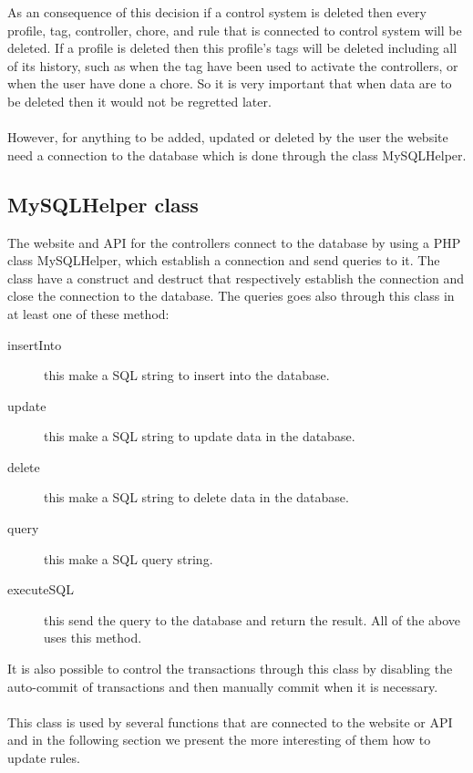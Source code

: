 As an consequence of this decision if a control system is deleted then every profile, tag, controller, chore, and rule that is connected to control system will be deleted. If a profile is deleted then this profile's tags will be deleted including all of its history, such as when the tag have been used to activate the controllers, or when the user have done a chore.
 So it is very important that when data are to be deleted then it would not be regretted later.  \\\\

However, for anything to be added, updated or deleted by the user the website need a connection to the database which is done through the class MySQLHelper. 

\subsection{MySQLHelper class}
The website and API for the controllers connect to the database by using a PHP class MySQLHelper, which establish a connection and send queries to it. The class have a construct and destruct that respectively establish the connection and close the connection to the database. The queries goes also through this class in at least one of these method:

\begin{description}
	\item[insertInto] this make a SQL string to insert into the database.
	\item[update] this make a SQL string to update data in the database.	
	\item[delete] this make a SQL string to delete data in the database.
	\item[query] this make a SQL query string.
	\item[executeSQL] this send the query to the database and return the result. All of the above uses this method.
\end{description}
  
It is also possible to control the transactions through this class by disabling the auto-commit of transactions and then manually commit when it is necessary. \\\\

This class is used by several functions that are connected to the website or API and in the following section we present the more interesting of them  how to update rules. 

